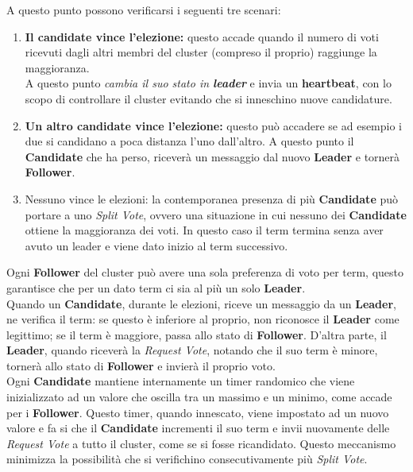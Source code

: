 A questo punto possono verificarsi i seguenti tre scenari:
\begin{enumerate}
	\item{\textbf{Il candidate vince l'elezione:}} questo accade quando il numero di voti ricevuti dagli altri membri del cluster (compreso il proprio) raggiunge la maggioranza.\\
	A questo punto \textit{cambia il suo stato in \textbf{leader}} e invia un \textbf{heartbeat}, con lo scopo di controllare il cluster evitando che si inneschino nuove candidature.

	\item{\textbf{Un altro candidate vince l'elezione:}} questo può accadere se ad esempio i due si candidano a poca distanza l'uno dall'altro. A questo punto il \textbf{Candidate} che ha perso, riceverà un messaggio dal nuovo \textbf{Leader} e tornerà \textbf{Follower}.
	
	\item Nessuno vince le elezioni: la contemporanea presenza di più \textbf{Candidate} può portare a uno \textit{Split Vote}, ovvero una situazione in cui nessuno dei \textbf{Candidate} ottiene la maggioranza dei voti. In questo caso il term termina senza aver avuto un leader e viene dato inizio al term successivo.
\end{enumerate}
Ogni \textbf{Follower} del cluster può avere una sola preferenza di voto per term, questo garantisce che per un dato term ci sia al più un solo \textbf{Leader}. \\
Quando un \textbf{Candidate}, durante le elezioni, riceve un messaggio da un \textbf{Leader}, ne verifica il term: se questo è inferiore al proprio, non riconosce il \textbf{Leader} come legittimo; se il term è maggiore, passa allo stato di \textbf{Follower}.
D'altra parte, il \textbf{Leader}, quando riceverà la \textit{Request Vote}, notando che il suo term è minore, tornerà allo stato di \textbf{Follower} e invierà il proprio voto.
\\
Ogni \textbf{Candidate} mantiene internamente un timer randomico che viene inizializzato ad un valore che oscilla tra un massimo e un minimo, come accade per i \textbf{Follower}.
Questo timer, quando innescato, viene impostato ad un nuovo valore e fa si che il \textbf{Candidate} incrementi il suo term e invii nuovamente delle \textit{Request Vote} a tutto il cluster, come se si fosse ricandidato. Questo meccanismo minimizza la possibilità che si verifichino consecutivamente più \textit{Split Vote}.



